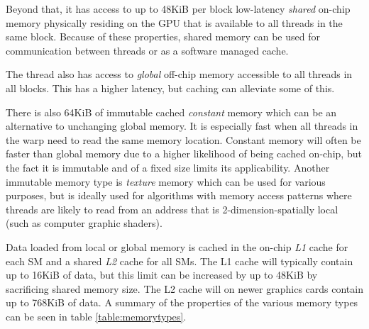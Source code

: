 Beyond that, it has access to up to 48KiB per block low-latency \emph{shared} on-chip memory physically residing on the GPU that is available to all threads in the same block. 
Because of these properties, shared memory can be used for communication between threads or as a software managed cache.

The thread also has access to \emph{global} off-chip memory accessible to all threads in all blocks.
This has a higher latency, but caching can alleviate some of this.

There is also 64KiB of immutable cached \emph{constant} memory which can be an alternative to unchanging global memory.
It is especially fast when all threads in the warp need to read the same memory location.
Constant memory will often be faster than global memory due to a higher likelihood of being cached on-chip, but the fact it is immutable and of a fixed size limits its applicability.
Another immutable memory type is \emph{texture} memory which can be used for various purposes, but is ideally used for algorithms with memory access patterns where threads are likely to read from an address that is 2-dimension-spatially local (such as computer graphic shaders).

Data loaded from local or global memory is cached in the on-chip \emph{L1} cache for each SM and a shared \emph{L2} cache for all SMs.
The L1 cache will typically contain up to 16KiB of data, but this limit can be increased by up to 48KiB by sacrificing shared memory size.
The L2 cache will on newer graphics cards contain up to 768KiB of data.
A summary of the properties of the various memory types can be seen in table \ref{table:memorytypes}.

\begin{table}[H]
\centering
{}
\caption{Properties of CUDA memory types\label{table:memorytypes}}
\end{table}

